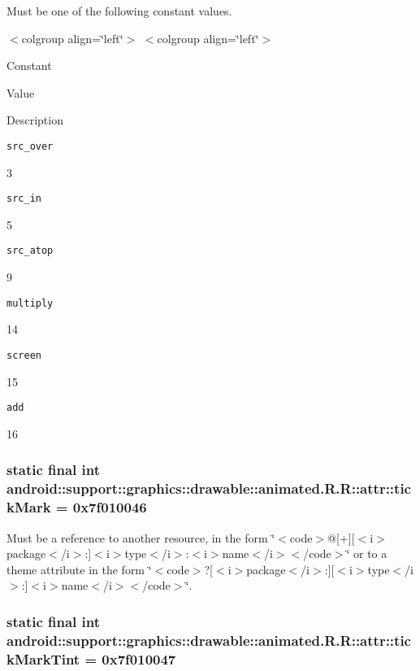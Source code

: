 Must be one of the following constant values. \begin{TabularC}{0}
\hline
\end{TabularC}
$<$colgroup align=\char`\"{}left\char`\"{}$>$ $<$colgroup align=\char`\"{}left\char`\"{}$>$ 

Constant

Value

Description 

{\tt src\_\-over}

3

{\tt src\_\-in}

5

{\tt src\_\-atop}

9

{\tt multiply}

14

{\tt screen}

15

{\tt add}

16\hypertarget{classandroid_1_1support_1_1graphics_1_1drawable_1_1animated_1_1_r_1_1attr_f1ad42ac572e79d85b4339c2a7d0fbd2}{
\subsubsection[{tickMark}]{\setlength{\rightskip}{0pt plus 5cm}static final int android::support::graphics::drawable::animated.R.R::attr::tickMark = 0x7f010046}}
\label{classandroid_1_1support_1_1graphics_1_1drawable_1_1animated_1_1_r_1_1attr_f1ad42ac572e79d85b4339c2a7d0fbd2}


Must be a reference to another resource, in the form \char`\"{}$<$code$>$@\mbox{[}+\mbox{]}\mbox{[}$<$i$>$package$<$/i$>$:\mbox{]}$<$i$>$type$<$/i$>$:$<$i$>$name$<$/i$>$$<$/code$>$\char`\"{} or to a theme attribute in the form \char`\"{}$<$code$>$?\mbox{[}$<$i$>$package$<$/i$>$:\mbox{]}\mbox{[}$<$i$>$type$<$/i$>$:\mbox{]}$<$i$>$name$<$/i$>$$<$/code$>$\char`\"{}. \hypertarget{classandroid_1_1support_1_1graphics_1_1drawable_1_1animated_1_1_r_1_1attr_7200923e1aefaf68377dfa269fe9be5a}{
\subsubsection[{tickMarkTint}]{\setlength{\rightskip}{0pt plus 5cm}static final int android::support::graphics::drawable::animated.R.R::attr::tickMarkTint = 0x7f010047}}
\label{classandroid_1_1support_1_1graphics_1_1drawable_1_1animated_1_1_r_1_1attr_7200923e1aefaf68377dfa269fe9be5a}


